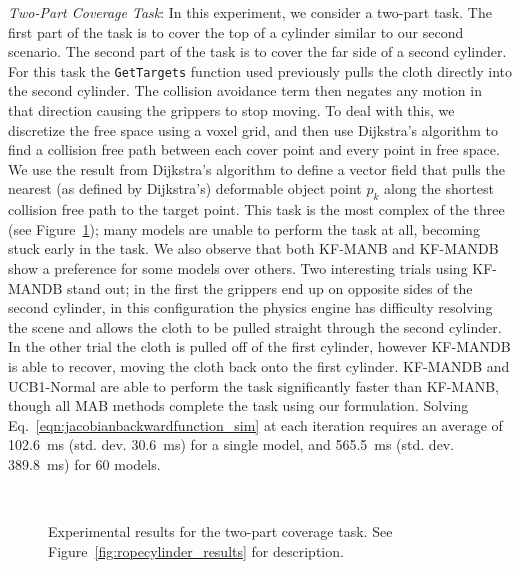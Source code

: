 \textit{Two-Part Coverage Task}: In this experiment, we consider a two-part task. The first part of the task is to cover the top of a cylinder similar to our second scenario. The second part of the task is to cover the far side of a second cylinder. For this task the \texttt{GetTargets} function used previously pulls the cloth directly into the second cylinder. The collision avoidance term then negates any motion in that direction causing the grippers to stop moving. To deal with this, we discretize the free space using a voxel grid, and then use Dijkstra's algorithm to find a collision free path between each cover point and every point in free space. We use the result from Dijkstra's algorithm to define a vector field that pulls the nearest (as defined by Dijkstra's) deformable object point $p_k$ along the shortest collision free path to the target point. This task is the most complex of the three (see Figure~\ref{fig:clothwafr_results}); many models are unable to perform the task at all, becoming stuck early in the task. We also observe that both KF-MANB and KF-MANDB show a preference for some models over others. Two interesting trials using KF-MANDB stand out; in the first the grippers end up on opposite sides of the second cylinder, in this configuration the physics engine has difficulty resolving the scene and allows the cloth to be pulled straight through the second cylinder. In the other trial the cloth is pulled off of the first cylinder, however KF-MANDB is able to recover, moving the cloth back onto the first cylinder. KF-MANDB and UCB1-Normal are able to perform the task significantly faster than KF-MANB, though all MAB methods complete the task using our formulation. Solving Eq.~\eqref{eqn:jacobianbackwardfunction_sim} at each iteration requires an average of 102.6~ms (std. dev. 30.6~ms) for a single model, and 565.5~ms (std. dev. 389.8~ms) for 60 models.

\begin{figure}[h]
    \centering
    \\
    \caption{Experimental results for the two-part coverage task. See Figure~\ref{fig:ropecylinder_results} for description.}
    \label{fig:clothwafr_results}
\end{figure}

